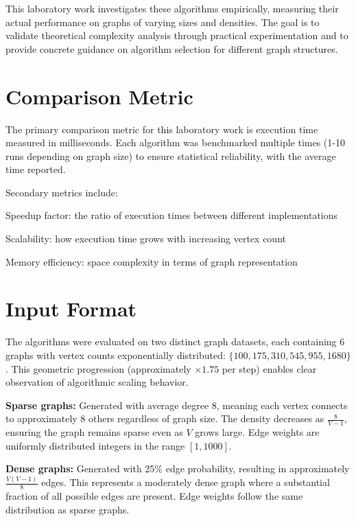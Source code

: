 \documentclass[12pt, a4paper]{report}
\begin{document}
This laboratory work investigates these algorithms empirically, measuring their actual performance on graphs of varying sizes and densities. The goal is to validate theoretical complexity analysis through practical experimentation and to provide concrete guidance on algorithm selection for different graph structures.

\section{Comparison Metric}

The primary comparison metric for this laboratory work is execution time measured in milliseconds. Each algorithm was benchmarked multiple times (1-10 runs depending on graph size) to ensure statistical reliability, with the average time reported.

Secondary metrics include:
\begin{dashenum}
  \item Speedup factor: the ratio of execution times between different implementations
  \item Scalability: how execution time grows with increasing vertex count
  \item Memory efficiency: space complexity in terms of graph representation
\end{dashenum}

\section{Input Format}

The algorithms were evaluated on two distinct graph datasets, each containing 6 graphs with vertex counts exponentially distributed: $\{100, 175, 310, 545, 955, 1680\}$. This geometric progression (approximately $\times 1.75$ per step) enables clear observation of algorithmic scaling behavior.

\textbf{Sparse graphs:} Generated with average degree 8, meaning each vertex connects to approximately 8 others regardless of graph size. The density decreases as $\frac{8}{V-1}$, ensuring the graph remains sparse even as $V$ grows large. Edge weights are uniformly distributed integers in the range $[1, 1000]$.

\textbf{Dense graphs:} Generated with 25\% edge probability, resulting in approximately $\frac{V(V-1)}{8}$ edges. This represents a moderately dense graph where a substantial fraction of all possible edges are present. Edge weights follow the same distribution as sparse graphs.
\end{document}
